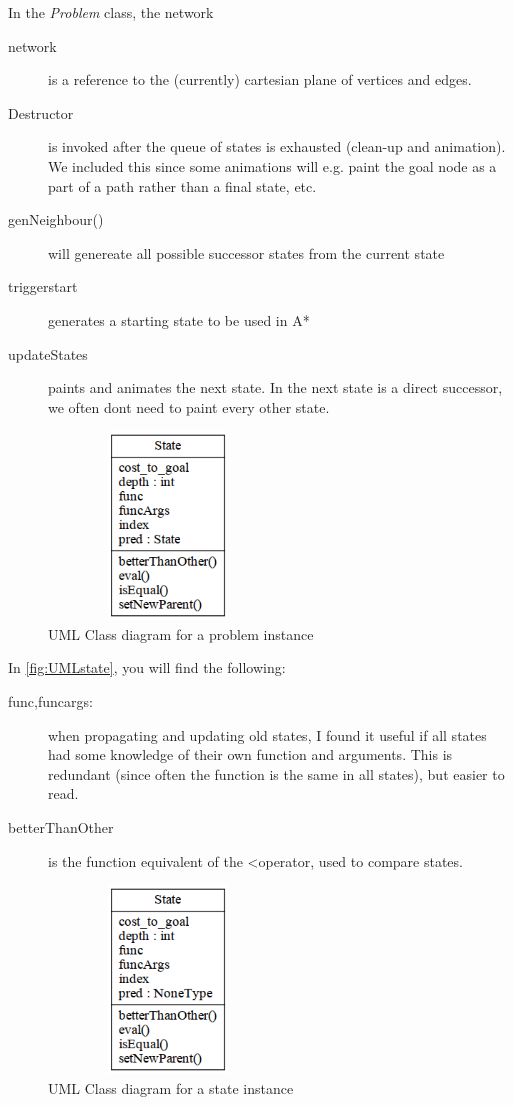 \documentclass[journal]{IEEEtran}
\begin{document}
In the \textit{Problem} class, the network 
\begin{description}
    \item[network] is a reference to the (currently) cartesian
    plane of vertices and edges. 
    \item[Destructor] is invoked after the queue of states is exhausted (clean-up and animation).
        We included this since some animations will e.g. paint the goal node as
        a part of a path rather than a final state, etc.
    \item[genNeighbour()] will genereate all possible successor states
        from the current state
    \item[triggerstart] generates a starting state to be used in A*
    \item[updateStates] paints and animates the next state. In the next state
        is a direct successor, we often dont need to paint every other state.
\end{description}

\begin{figure}[Hb]
\centering
\includegraphics[height=5cm,keepaspectratio,width=2.5in]{fig/problem.png}%
\caption{UML Class diagram for a problem instance}
\label{fig:UMLproblem}
\end{figure}

In \autoref{fig:UMLstate}, you will find the following:
\begin{description}
    \item[func,funcargs:] when propagating and updating old states, I found it
        useful if all states had some knowledge of their own function and arguments.
        This is redundant (since often the function is the same in all states),
        but easier to read.
    \item[betterThanOther] is the function equivalent of the \textless operator,
        used to compare states.
\end{description}


\begin{figure}[Hb]
\centering
\includegraphics[height=5cm,keepaspectratio,width=2.5in]{fig/state.png}%
\caption{UML Class diagram for a state instance}
\label{fig:UMLstate}
\end{figure}
\end{document}
